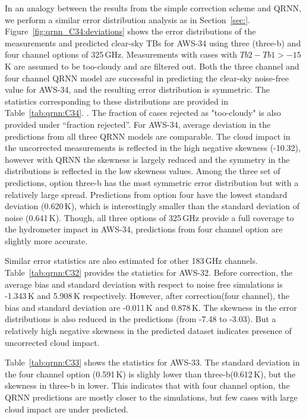 \documentclass[12pt]{article}
\begin{document}
In an analogy between the results from the simple correction scheme and QRNN, we perform a similar error distribution analysis as in Section~\ref{sec:}. Figure~\ref{fig:qrnn_C34:deviations} shows the error distributions of the measurements and predicted clear-sky TBs for AWS-34 using three (three-b) and four channel options of 325\,GHz. Measurements with cases with $Tb2 - Tb1 > -15$\,K are assumed to be too-cloudy and are filtered out. Both the three channel and four channel QRNN model are successful in predicting the clear-sky noise-free value for AWS-34, and the resulting error distribution is symmetric. The statistics corresponding to these distributions are provided in Table~\ref{tab:qrnn:C34}. . The fraction of cases rejected as "too-cloudy" is also provided under ``fraction rejected''. For AWS-34, average deviation in the predictions from all three QRNN models are comparable.  The cloud impact in the uncorrected measurements is reflected in the high negative skewness (-10.32), however with QRNN the skewness is largely reduced and the symmetry in the distributions is reflected in the low skewness values. Among the three set of predictions, option three-b has the most symmetric error distribution but with a relatively large spread. Predictions from option four have the lowest standard deviation (0.620\,K), which is interestingly smaller than the standard deviation of noise (0.641\,K). Though, all three options of 325\,GHz provide a full coverage to the hydrometer impact in AWS-34, predictions from four channel option are slightly more accurate.    

Similar error statistics are also estimated for other 183\,GHz channels. Table~\ref{tab:qrnn:C32} provides the statistics for AWS-32. Before correction, the average bias and standard deviation with respect to noise free simulations is -1.343\,K and 5.908\,K respectively. However, after correction(four channel), the bias and standard deviation are -0.011\,K and 0.878\,K. The skewness in the error distributions is also reduced in the predictions (from -7.48 to -3.03). But a relatively high negative skewness in the predicted dataset indicates presence of uncorrected cloud impact. 

Table~\ref{tab:qrnn:C33} shows the statistics for AWS-33. The standard deviation in the four channel option (0.591\,K) is slighly lower than three-b(0.612\,K), but the skewness in three-b in lower. This indicates that with four channel option, the QRNN predictions are mostly closer to the simulations, but few cases with large cloud impact are under predicted. 
\end{document}
